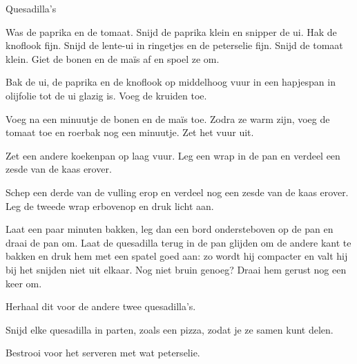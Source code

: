 \begin{recipe}{Quesadilla's}
\begin{steps}
  \item Was de paprika en de tomaat. Snijd de paprika klein en snipper de ui. Hak de knoflook fijn. Snijd de
        lente-ui in ringetjes en de peterselie fijn. Snijd de tomaat klein. Giet
        de bonen en de maïs af en spoel ze om.
  \item Bak de ui, de paprika en de knoflook op middelhoog vuur in een hapjespan
        in olijfolie tot de ui glazig is. Voeg de kruiden toe.
  \item Voeg na een minuutje de bonen en de maïs toe. Zodra ze warm zijn, voeg de
        tomaat toe en roerbak nog een minuutje. Zet het vuur uit.
  \item Zet een andere koekenpan op laag vuur. Leg een wrap in de pan en verdeel
        een zesde van de kaas erover.
  \item Schep een derde van de vulling erop en verdeel nog een zesde van de kaas
        erover. Leg de tweede wrap erbovenop en druk licht aan.
  \item Laat een paar minuten bakken, leg dan een bord ondersteboven op de pan en
        draai de pan om. Laat de quesadilla terug in de pan glijden om de andere
        kant te bakken en druk hem met een spatel goed aan: zo wordt hij
        compacter en valt hij bij het snijden niet uit elkaar. Nog niet bruin
        genoeg? Draai hem gerust nog een keer om.
  \item Herhaal dit voor de andere twee quesadilla's.
  \item Snijd elke quesadilla in parten, zoals een pizza, zodat je ze samen
        kunt delen.
  \item Bestrooi voor het serveren met wat peterselie.
\end{steps}

\end{recipe}
